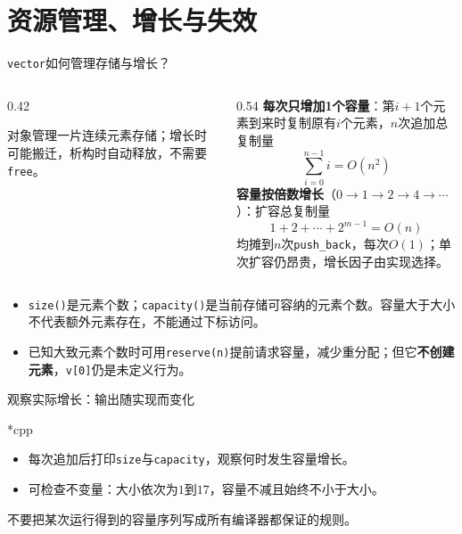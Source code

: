 \section{资源管理、增长与失效}

\begin{frame}{\texttt{vector}如何管理存储与增长？}
\begin{columns}[T]
\begin{column}{0.42\textwidth}

\small 对象管理一片连续元素存储；增长时可能搬迁，析构时自动释放，不需要\texttt{free}。
\end{column}
\begin{column}{0.54\textwidth}
\textbf{每次只增加1个容量}：第$i+1$个元素到来时复制原有$i$个元素，$n$次追加总复制量
\[\textstyle\sum_{i=0}^{n-1} i = O(n^2)\]
\textbf{容量按倍数增长}（$0\to1\to2\to4\to\cdots$）：扩容总复制量
\[1+2+\cdots+2^{m-1}=O(n)\]
均摊到$n$次\texttt{push\_back}，每次$O(1)$；单次扩容仍昂贵，增长因子由实现选择。
\end{column}
\end{columns}
\medskip
\begin{itemize}
\item \texttt{size()}是元素个数；\texttt{capacity()}是当前存储可容纳的元素个数。容量大于大小不代表额外元素存在，不能通过下标访问。
\item 已知大致元素个数时可用\texttt{reserve(n)}提前请求容量，减少重分配；但它\textbf{不创建元素}，\texttt{v[0]}仍是未定义行为。
\end{itemize}
\end{frame}

\begin{frame}{观察实际增长：输出随实现而变化}
\begin{Code}*{cpp}\end{Code}
\begin{itemize}
\item 每次追加后打印\texttt{size}与\texttt{capacity}，观察何时发生容量增长。
\item 可检查不变量：大小依次为$1$到$17$，容量不减且始终不小于大小。
\end{itemize}
\alert{不要把某次运行得到的容量序列写成所有编译器都保证的规则。}
\end{frame}


